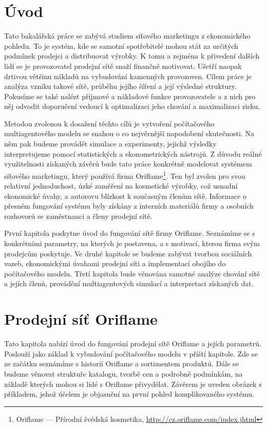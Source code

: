 \documentclass[a4wide,12pt]{report}
\begin{document}
\chapter*{Úvod}
Tato bakalářská práce se zabývá studiem síťového marketingu z ekonomického pohledu. To je systém, kde se samotní spotřebitelé mohou stát za určitých podmínek prodejci a distribuovat výrobky. K tomu a zejména k přivedení dalších lidí se je provozovatel prodejní sítě snaží finančně motivovat. Ušetří naopak drtivou většinu nákladů na vybudování kamenných provozoven. Cílem práce je analýza vzniku takové sítě, průběhu jejího šíření a její výsledné struktury. Pokusíme se také nalézt příjmové a nákladové funkce provozovatele a z nich pro něj odvodit doporučení vedoucí k optimalizaci jeho chování a maximalizaci zisku.

Metodou zvolenou k dosažení těchto cílů je vytvoření počítačového multiagentového modelu se snahou o co nejvěrnější napodobení skutečnosti. Na něm pak budeme provádět simulace a experimenty, jejichž výsledky interpretujeme pomocí statistických a ekonometrických nástrojů. Z důvodu reálné využitelnosti získaných závěrů bude tato práce konkrétně modelovat systémem síťového marketingu, který používá firma Oriflame\footnote{Oriflame --- Přírodní švédská kosmetika, \url{http://cz.oriflame.com/index.jhtml}}. Ten byl zvolen pro svou relativní jednoduchost, úzké zaměření na kosmetické výrobky, což usnadní ekonomické úvahy, a autorovu blízkost k současným členům sítě. Informace o přesném fungování systému byly získány z interních materiálů firmy a osobních rozhovorů se zaměstnanci a členy prodejní sítě.

První kapitola poskytne úvod do fungování sítě firmy Oriflame. Seznámíme se s konkrétními parametry, na kterých je postavena, a s motivací, kterou firma svým prodejcům poskytuje. Ve druhé kapitole se budeme zabývat tvorbou sociálních vazeb, ekonomickými úvahami prodejní síti a implementací obojího do počítačového modelu. Třetí kapitola bude věnována samotné analýze chování sítě a jejích členů, provádění multiagentových simulací a interpretaci získaných dat.
\chapter{Prodejní síť Oriflame}
Tato kapitola nabízí úvod do fungování prodejní sítě Oriflame a jejích parametrů. Poslouží jako základ k vybudování počítačového modelu v příští kapitole. Zde se ze začátku seznámíme s historií Oriflame a sortimentem produktů. Dále se budeme věnovat struktuře katalogu, tvorbě cen a podrobně podmínkám, na základě kterých mohou si lidé s Oriflame přivydělat. Závěrem je uveden obrázek s příkladem, jehož účelem je objasnění na první pohled komplikovaného systému.
\end{document}
